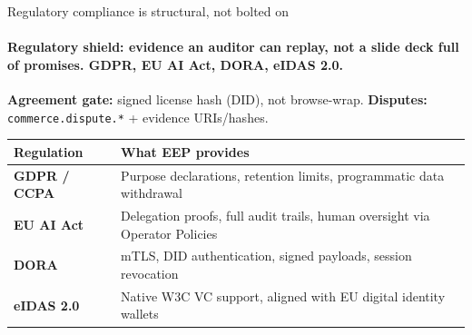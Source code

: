 \documentclass[aspectratio=169,10pt]{beamer}
\begin{document}
\begin{frame}[shrink=5]{Regulatory compliance is structural, not bolted on}
\framesubtitle{\textbf{Regulatory shield:} evidence an auditor can replay, not a slide deck full of promises. GDPR, EU AI Act, DORA, eIDAS 2.0.}

\vspace{0.04cm}
{\scriptsize\color{txtm}%
\textbf{Agreement gate:} signed license hash (DID), not browse-wrap. \textbf{Disputes:} \texttt{commerce.dispute.*} + evidence URIs/hashes.%
}

\vspace{0.12cm}

\begin{center}
\renewcommand{\arraystretch}{1.3}
{\footnotesize
\begin{tabular}{l l}
\toprule
\textcolor{txtw}{\textbf{Regulation}} & \textcolor{slate}{\textbf{What EEP provides}} \\
\midrule
\textbf{GDPR / CCPA} & Purpose declarations, retention limits, programmatic data withdrawal \\
\textbf{EU AI Act} & Delegation proofs, full audit trails, human oversight via Operator Policies \\
\textbf{DORA} & mTLS, DID authentication, signed payloads, session revocation \\
\textbf{eIDAS 2.0} & Native W3C VC support, aligned with EU digital identity wallets \\
\bottomrule
\end{tabular}
}
\end{center}

\vspace{0.28cm}


\end{frame}
\end{document}
